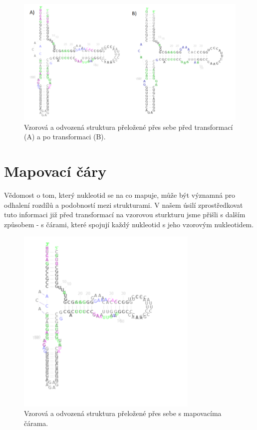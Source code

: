 \begin{figure}[H]
  \centering
  \includegraphics[width=140mm]{../img/kap02/animation.png}
  \caption{Vzorová a odvozená struktura přeložené přes sebe před transformací
  (A) a po transformaci (B).}
\end{figure}

\section{Mapovací čáry}

Vědomost o tom, který nukleotid se na co mapuje, může být významná pro odhalení
rozdílů a podobností mezi strukturami. V našem úsilí zprostředkovat tuto
informaci již před transformací na vzorovou sturkturu jsme přišli s dalším
způsobem - s čárami, které spojují každý nukleotid s jeho vzorovým nukleotidem.

\begin{figure}[H]
  \centering
  \includegraphics[height=90mm]{../img/kap02/mappingLines/small.png}
  \caption{Vzorová a odvozená struktura  přeložené přes sebe s mapovacíma
  čárama.}
\end{figure}

